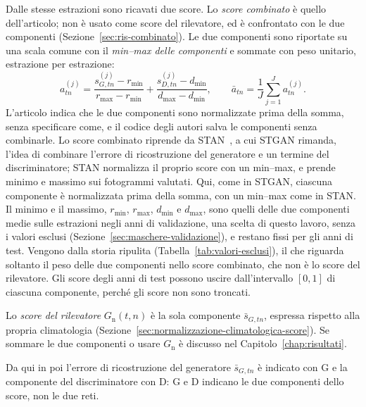 Dalle stesse estrazioni sono ricavati due score. Lo \emph{score combinato} è quello dell'articolo; non è usato come score del rilevatore, ed è confrontato con le due componenti (Sezione~\ref{sec:ris-combinato}). Le due componenti sono riportate su una scala comune con il \emph{min--max delle componenti} e sommate con peso unitario, estrazione per estrazione:
\begin{equation}
a^{(j)}_{tn}=
\frac{s^{(j)}_{G,tn}-r_{\min}}{r_{\max}-r_{\min}}
+\frac{s^{(j)}_{D,tn}-d_{\min}}{d_{\max}-d_{\min}},
\qquad
\bar{a}_{tn}=\frac{1}{J}\sum_{j=1}^{J}a^{(j)}_{tn}.
\end{equation}
L'articolo indica che le due componenti sono normalizzate prima della somma, senza specificare come, e il codice degli autori salva le componenti senza combinarle. Lo score combinato riprende da STAN~\cite{lee2018stan}, a cui STGAN rimanda, l'idea di combinare l'errore di ricostruzione del generatore e un termine del discriminatore; STAN normalizza il proprio score con un min--max, e prende minimo e massimo sui fotogrammi valutati. Qui, come in STGAN, ciascuna componente è normalizzata prima della somma, con un min--max come in STAN. Il minimo e il massimo, $r_{\min}$, $r_{\max}$, $d_{\min}$ e $d_{\max}$, sono quelli delle due componenti medie sulle estrazioni negli anni di validazione, una scelta di questo lavoro, senza i valori esclusi (Sezione~\ref{sec:maschere-validazione}), e restano fissi per gli anni di test. Vengono dalla storia ripulita (Tabella~\ref{tab:valori-esclusi}), il che riguarda soltanto il peso delle due componenti nello score combinato, che non è lo score del rilevatore. Gli score degli anni di test possono uscire dall'intervallo $[0,1]$ di ciascuna componente, perché gli score non sono troncati.

Lo \emph{score del rilevatore} $G_{\mathrm{n}}(t,n)$ è la sola componente $\bar{s}_{G,tn}$, espressa rispetto alla propria climatologia (Sezione~\ref{sec:normalizzazione-climatologica-score}). Se sommare le due componenti o usare $G_{\mathrm{n}}$ è discusso nel Capitolo~\ref{chap:risultati}.

Da qui in poi l'errore di ricostruzione del generatore $\bar{s}_{G,tn}$ è indicato con G e la componente del discriminatore con D: G e D indicano le due componenti dello score, non le due reti.


